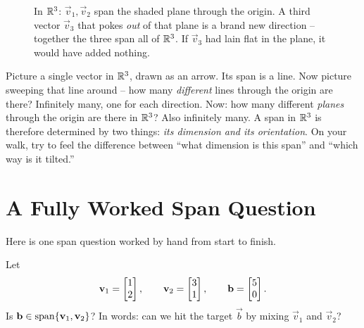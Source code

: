 \begin{figure}[H]
\centering
{}
\caption{In $\mathbb{R}^3$: $\vec{v}_1,\vec{v}_2$ span the shaded plane through the origin. A third vector $\vec{v}_3$ that pokes \emph{out} of that plane is a brand new direction -- together the three span all of $\mathbb{R}^3$. If $\vec{v}_3$ had lain flat in the plane, it would have added nothing.}
\label{ch03:three-3d}
\end{figure}

\begin{walkbox}
Picture a single vector in $\mathbb{R}^3$, drawn as an arrow. Its span is a line. Now picture sweeping that line around -- how many \emph{different} lines through the origin are there? Infinitely many, one for each direction. Now: how many different \emph{planes} through the origin are there in $\mathbb{R}^3$? Also infinitely many. A span in $\mathbb{R}^3$ is therefore determined by two things: \emph{its dimension and its orientation}. On your walk, try to feel the difference between ``what dimension is this span'' and ``which way is it tilted.''
\end{walkbox}

\section{A Fully Worked Span Question}

Here is one span question worked by hand from start to finish.

\begin{example}\label{ch03:ex-in-span}
Let
\[
  \mathbf{v}_1 = \begin{bmatrix}1\\2\end{bmatrix}, \qquad \mathbf{v}_2 = \begin{bmatrix}3\\1\end{bmatrix}, \qquad \mathbf{b} = \begin{bmatrix}5\\0\end{bmatrix}.
\]
Is $\mathbf{b} \in \operatorname{span}\{\mathbf{v}_1, \mathbf{v}_2\}$? In words: can we hit the target $\vec{b}$ by mixing $\vec{v}_1$ and $\vec{v}_2$?
\end{example}

